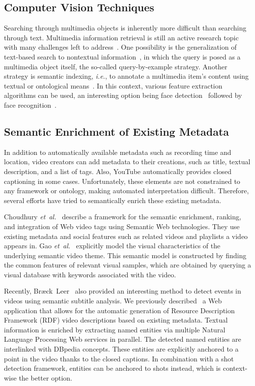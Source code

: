 \documentclass[runningheads,a4paper]{llncs}
\begin{document}
\subsection{Computer Vision Techniques}
Searching through multimedia objects is inherently more difficult than searching through text.
Multimedia information retrieval is still an active research topic with many challenges left to address~\cite{Hanjalic:2008}.
One possibility is the generalization of text-based search to nontextual information~\cite{Sivic:2008}, in which the query is posed as a multimedia object itself, the so-called query-by-example strategy.
Another strategy is semantic indexing, \emph{i.e.}, to annotate a multimedia item's content using textual or ontological means~\cite{Hauptmann:2008}.
In this context, various feature extraction algorithms can be used, an interesting option being face detection~\cite{ViolaJones} followed by face recognition~\cite{Verstockt:2009}.

\subsection{Semantic Enrichment of Existing Metadata}
In addition to automatically available metadata such as recording time and location, video creators can add metadata to their creations, such as title, textual description, and a list of tags. Also, YouTube automatically provides closed captioning in some cases. Unfortunately, these elements are not constrained to any framework or ontology, making automated interpretation difficult. Therefore, several efforts have tried to semantically enrich these existing metadata. 

Choudhury \emph{et~al.}~\cite{Choudhury:YouTube} describe a framework for the semantic enrichment, ranking, and integration of Web video tags using Semantic Web technologies. They use existing metadata and social features such as related videos and playlists a video appears in. Gao \emph{et~al.}~\cite{Gao:2009} explicitly model the visual characteristics of the underlying semantic video theme. This semantic model is constructed by finding the common features of relevant visual samples, which are obtained by querying a visual database with keywords associated with the video. 

Recently, Br{\ae}ck~Leer~\cite{BraeckLeer:2011} also provided an interesting method to detect events in videos using semantic subtitle analysis. We previously described~\cite{semwebvid} a Web application that allows for the automatic generation of Resource Description Framework (RDF) video descriptions based on existing metadata. Textual information is enriched by extracting named entities via multiple Natural Language Processing Web services in parallel. The detected named entities are interlinked with DBpedia concepts. These entities are explicitly anchored to a point in the video thanks to the closed captions. In combination with a shot detection framework, entities can be anchored to shots instead, which is context-wise the better option.
\end{document}
